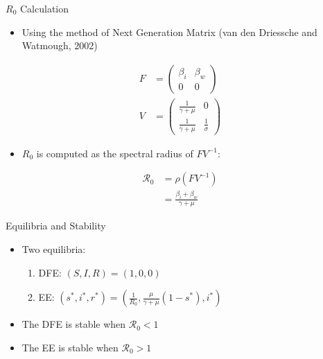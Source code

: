 \documentclass{beamer}\usepackage[]{graphicx}\usepackage[]{color}
\begin{document}
\begin{frame}[t]{$R_0$ Calculation}
\begin{itemize}
\item Using the method of Next Generation Matrix (van den Driessche and Watmough, 2002)
\end{itemize}
\begin{align*}
		F&=\begin{pmatrix}
			\beta_i & \beta_w\\
			0 & 0
			\end{pmatrix}\\
		V&=\begin{pmatrix}
			\frac{1}{\gamma+\mu} & 0\\
			\frac{1}{\gamma+\mu} &\frac{1}{\sigma}
			\end{pmatrix}
\end{align*}
\begin{itemize}
\item $R_0$ is computed as the spectral radius of $FV^{-1}$:
\end{itemize}
\begin{align*}
    {\mathcal R_0} &= \rho(FV^{-1})\\
		           &=\frac{\beta_i+\beta_w}{\gamma+\mu}
\end{align*}
\end{frame}

\begin{frame}{Equilibria and Stability}
\begin{itemize}
\setlength\itemsep{2em}
\item Two equilibria:\\[1em]
\begin{enumerate}
\setlength\itemsep{2em}
\item DFE: $(S,I,R)=(1,0,0)$
\item EE: $(s^{*},i^{*},r^{*}) = (\frac{1}{R_0}, \frac{\mu}{\gamma+\mu}(1-s^{*}), i^{*})$
\end{enumerate}
\item The DFE is stable when ${\mathcal R_0}<1$
\item The EE is stable when ${\mathcal R_0}>1$
\end{itemize}
\end{frame}
\end{document}
